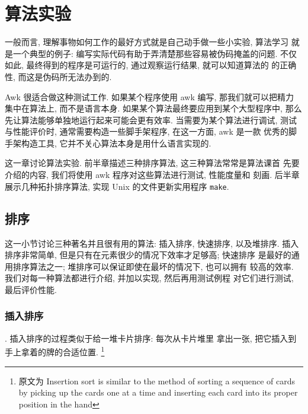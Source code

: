 \chapter{算法实验}
\label{chap:experiments_with_algorithms}

一般而言, 理解事物如何工作的最好方式就是自己动手做一些小实验, 算法学习
就是一个典型的例子: 编写实际代码有助于弄清楚那些容易被伪码掩盖的问题.
不仅如此, 最终得到的程序是可运行的, 通过观察运行结果, 就可以知道算法的
的正确性, 而这是伪码所无法办到的.

Awk 很适合做这种测试工作. 如果某个程序使用 awk 编写, 那我们就可以把精力
集中在算法上, 而不是语言本身. 如果某个算法最终要应用到某个大型程序中,
那么先让算法能够单独地运行起来可能会更有效率. 当需要为某个算法进行调试,
测试与性能评价时, 通常需要构造一些脚手架程序, 在这一方面, awk 是一款
优秀的脚手架构造工具, 它并不关心算法本身是用什么语言实现的.

这一章讨论算法实验. 前半章描述三种排序算法, 这三种算法常常是算法课首
先要介绍的内容, 我们将使用 awk 程序对这些算法进行测试, 性能度量和
刻画. 后半章展示几种拓扑排序算法, 实现 Unix 的文件更新实用程序
\texttt{make}.

\section{排序}
\label{sec:sorting}

这一小节讨论三种著名并且很有用的算法: 插入排序, 快速排序, 以及堆排序.
插入排序非常简单, 但是只有在元素很少的情况下效率才足够高; 快速排序
是最好的通用排序算法之一; 堆排序可以保证即使在最坏的情况下, 也可以拥有
较高的效率. 我们对每一种算法都进行介绍, 并加以实现, 然后再用测试例程
对它们进行测试, 最后评价性能.

\subsection{插入排序}
\label{subsec:insertion_sort}
. 插入排序的过程类似于给一堆卡片排序: 每次从卡片堆里
拿出一张, 把它插入到手上拿着的牌的合适位置.
\footnote{原文为 Insertion sort is similar
    to the method of sorting a sequence of cards by picking up the cards
    one at a time and inserting each card into its proper position in the
hand}

